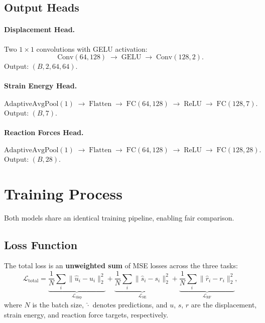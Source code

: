 \documentclass[11pt,a4paper]{article}
\begin{document}
\subsection{Output Heads}

\paragraph{Displacement Head.}
Two $1 \times 1$ convolutions with GELU activation:
\[
    \text{Conv}(64, 128) \;\to\; \text{GELU} \;\to\; \text{Conv}(128, 2).
\]
Output: $(B, 2, 64, 64)$.

\paragraph{Strain Energy Head.}
\[
    \text{AdaptiveAvgPool}(1) \;\to\; \text{Flatten} \;\to\;
    \text{FC}(64, 128) \;\to\; \text{ReLU} \;\to\; \text{FC}(128, 7).
\]
Output: $(B, 7)$.

\paragraph{Reaction Forces Head.}
\[
    \text{AdaptiveAvgPool}(1) \;\to\; \text{Flatten} \;\to\;
    \text{FC}(64, 128) \;\to\; \text{ReLU} \;\to\; \text{FC}(128, 28).
\]
Output: $(B, 28)$.


\section{Training Process}
\label{sec:training}

Both models share an identical training pipeline, enabling fair comparison.

\subsection{Loss Function}

The total loss is an \textbf{unweighted sum} of MSE losses across the three
tasks:
\[
    \mathcal{L}_\text{total} = \underbrace{\frac{1}{N}
    \sum_{i} \| \hat{u}_i - u_i \|_2^2}_{\mathcal{L}_\text{disp}}
    + \underbrace{\frac{1}{N} \sum_{i} \| \hat{s}_i - s_i \|_2^2
    }_{\mathcal{L}_\text{SE}}
    + \underbrace{\frac{1}{N} \sum_{i} \| \hat{r}_i - r_i \|_2^2
    }_{\mathcal{L}_\text{RF}},
\]
where $N$ is the batch size, $\hat{\cdot}$ denotes predictions, and
$u$, $s$, $r$ are the displacement, strain energy, and reaction force targets,
respectively.
\end{document}
